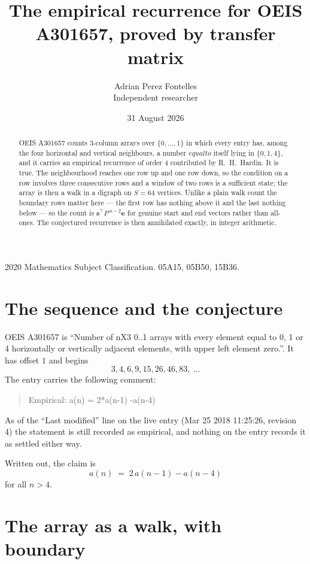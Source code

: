 \documentclass[11pt,a4paper]{article}
\title{The empirical recurrence for OEIS A301657, proved by transfer matrix}
\author{Adrian Perez Fontelles\\ \small Independent researcher}
\date{31 August 2026}
\theoremstyle{plain}
\theoremstyle{definition}
\begin{document}
\maketitle

\begin{abstract}
OEIS A301657 counts $3$-column arrays over $\{0,\dots,1\}$ in which every entry has,
among the four horizontal and vertical neighbours, a number $equal to$ itself lying in $\{0,1,4\}$, and it carries an empirical
recurrence of order $4$ contributed by R.~H.~Hardin. It is true. The neighbourhood
reaches one row up and one row down, so the condition on a row involves three consecutive
rows and a window of two rows is a sufficient state; the array is then a walk in a digraph
on $S=64$ vertices. Unlike a plain walk count the boundary rows matter here --- the first
row has nothing above it and the last nothing below --- so the count is
$\mathbf{s}^{\!\top}P^{\,n-2}\mathbf{e}$ for genuine start and end vectors rather than
all-ones. The conjectured recurrence is then annihilated exactly, in integer arithmetic.
\end{abstract}

\noindent\small 2020 Mathematics Subject Classification. 05A15, 05B50, 15B36.\normalsize

\section{The sequence and the conjecture}

OEIS A301657 is ``Number of nX3 0..1 arrays with every element equal to 0, 1 or 4 horizontally or vertically adjacent elements, with upper left element zero.''. It has offset
$1$ and begins
\[
3, 4, 6, 9, 15, 26, 46, 83,\ \dots
\]
The entry carries the following comment:
\begin{quote}\small
Empirical: a(n) = 2*a(n-1) -a(n-4)
\end{quote}
As of the ``Last modified'' line on the live entry (Mar 25 2018 11:25:26, revision
4) the statement is still recorded as empirical, and nothing on the entry
records it as settled either way.

Written out, the claim is
\begin{equation}\label{eq:conj}
a(n)\;=\;2\,a(n-1) - a(n-4)
\end{equation}
for all $n>4$.

\section{The array as a walk, with boundary}
\end{document}
